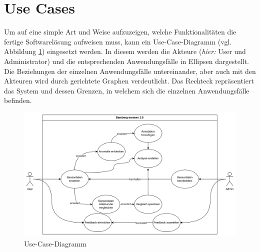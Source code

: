 \section{Use Cases}
Um auf eine simple Art und Weise aufzuzeigen, welche Funktionalitäten die fertige Softwarelösung aufweisen muss, kann ein Use-Case-Diagramm (vgl. Abbildung \ref{fig:usecase_diagram}) eingesetzt werden. In diesem werden die Akteure (\textit{hier:} User und Administrator) und die entsprechenden Anwendungsfälle in Ellipsen dargestellt. Die Beziehungen der einzelnen Anwendungsfälle untereinander, aber auch mit den Akteuren wird durch gerichtete Graphen verdeutlicht. Das Rechteck repräsentiert das System und dessen Grenzen, in welchem sich die einzelnen Anwendungsfälle befinden. 

\begin{figure}[t]
    \centering
    \includegraphics[width=1.5\textwidth]{figures/usecases.png}
    \decoRule
    \caption[Use-Case-Diagramm]{Use-Case-Diagramm}
    \label{fig:usecase_diagram}
\end{figure}